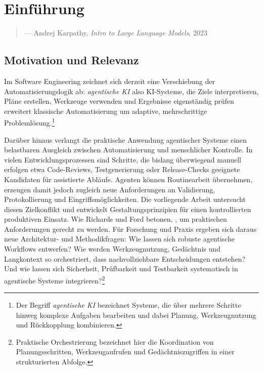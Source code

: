 \chapter{Einführung}
%
%

\begin{quote}
\textit{}
\smallskip
\begin{flushright}
— Andrej Karpathy, \textit{Intro to Large Language Models}, 2023
\end{flushright}
\end{quote}

\section{Motivation und Relevanz}

Im Software Engineering zeichnet sich derzeit eine Verschiebung der Automatisierungslogik ab: \emph{agentische KI} \textendash{} also KI-Systeme, die Ziele interpretieren, Pläne erstellen, Werkzeuge verwenden und Ergebnisse eigenständig prüfen \textendash{} erweitert klassische Automatisierung um adaptive, mehrschrittige Problemlösung.\footnote{Der Begriff \emph{agentische KI} bezeichnet Systeme, die über mehrere Schritte hinweg komplexe Aufgaben bearbeiten und dabei Planung, Werkzeugnutzung und Rückkopplung kombinieren.}
 
Darüber hinaus verlangt die praktische Anwendung agentischer Systeme einen belastbaren Ausgleich zwischen Automatisierung und menschlicher Kontrolle. In vielen Entwicklungsprozessen sind Schritte, die bislang überwiegend manuell erfolgen \textendash{} etwa Code-Reviews, Testgenerierung oder Release-Checks \textendash{} geeignete Kandidaten für assistierte Abläufe. Agenten können Routinearbeit übernehmen, erzeugen damit jedoch zugleich neue Anforderungen an Validierung, Protokollierung und Eingriffsmöglichkeiten. Die vorliegende Arbeit untersucht diesen Zielkonflikt und entwickelt Gestaltungsprinzipien für einen kontrollierten produktiven Einsatz.
Wie Richards und Ford betonen, , um praktischen Anforderungen gerecht zu werden.
Für Forschung und Praxis ergeben sich daraus neue Architektur- und Methodikfragen: Wie lassen sich robuste agentische Workflows entwerfen? Wie werden Werkzeugnutzung, Gedächtnis und Langkontext so orchestriert, dass nachvollziehbare Entscheidungen entstehen? Und wie lassen sich Sicherheit, Prüfbarkeit und Testbarkeit systematisch in agentische Systeme integrieren?\footnote{Praktische Orchestrierung bezeichnet hier die Koordination von Planungsschritten, Werkzeugaufrufen und Gedächtniszugriffen in einer strukturierten Abfolge.}

